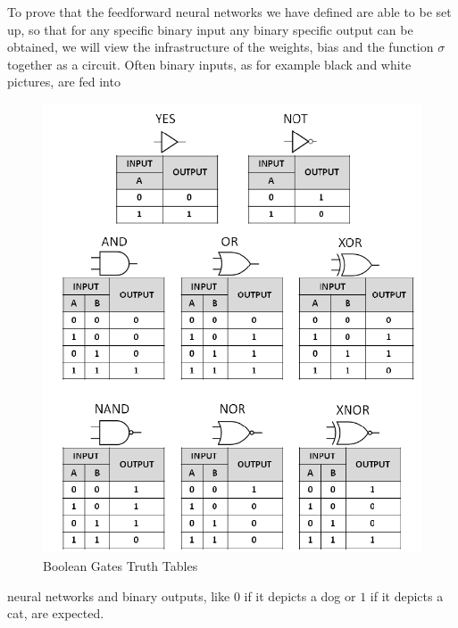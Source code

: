 \documentclass{article}
\theoremstyle{definition}
\newcommand*{\figuretitle}[1]{%
    {\centering%
    \textbf{#1}%
    \par\medskip}%
}
\begin{document}
To prove that the feedforward neural networks we have defined are able to be set up, so that for any specific binary input any binary specific output can be obtained, we will view the infrastructure of the weights, bias and the function $\sigma$ together as a circuit. Often binary inputs, as for example black and white pictures, are fed into 
\begin{figure}
\centering
\includegraphics[scale=0.2]{graphics/Summary-of-the-common-Boolean-logic-gates-with-symbols-and-truth-tables.png}
\caption{Boolean Gates Truth Tables \cite{booleanGates}}
\label{fig:bool_gate}
\end{figure}
neural networks and binary outputs, like $0$ if it depicts a dog or $1$ if it depicts a cat, are expected.
\end{document}

